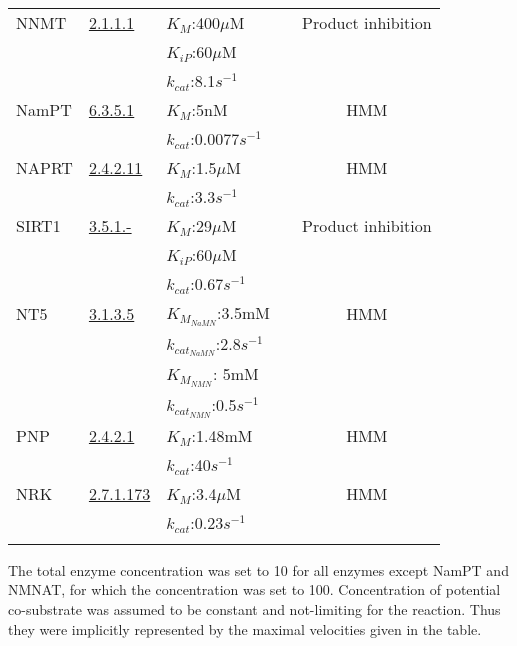 \documentclass[a4paper,10pt]{article} \usepackage[utf8x]{inputenc}
\begin{document}
\begin{longtable}{p{3cm}p{2cm}p{3cm}cc}
    \\ \hline
NNMT & \href{http://www.chem.qmul.ac.uk/iubmb/enzyme/EC2/1/1/1.html}{2.1.1.1}
&$K_M$:400$\mu$M  & \cite{Aksoy1994} & Product inhibition\\
& & $K_{iP}$:60$\mu$M  & & 
    \\
    & & $k_{cat}$:8.1$s^{-1}$  & \cite{Alston1988}& 
    \\  \hline
NamPT & \href{http://www.chem.qmul.ac.uk/iubmb/enzyme/EC6/3/5/1.html}{6.3.5.1}
&$K_M$:5nM  & \cite{Burgos2008} & HMM\\
    & & $k_{cat}$:0.0077$s^{-1}$  & & 
    \\  \hline
    NAPRT &
       \href{http://www.chem.qmul.ac.uk/iubmb/enzyme/EC2/4/2/11.html}{2.4.2.11}
    &$K_M$:1.5$\mu$M  & \cite{Burgos2008} & HMM\\
    & & $k_{cat}$:3.3$s^{-1}$  & & 
    \\  \hline
    SIRT1 &
    \href{http://www.chem.qmul.ac.uk/iubmb/enzyme/EC3/5/1/index.html}{3.5.1.-}
    &$K_M$:29$\mu$M  & \cite{Borra2004} & Product inhibition\\
    & & $K_{iP}$:60$\mu$M  & & 
    \\
    & & $k_{cat}$:0.67$s^{-1}$  & & 
    \\  \hline
    NT5 &
    \href{http://www.chem.qmul.ac.uk/iubmb/enzyme/EC3/1/3/5.html}{3.1.3.5}
    &$K_{M_{NaMN}}$:3.5mM  & \cite{PMID26385918} & HMM \\
    & & $k_{{cat}_{NaMN}}$:2.8$s^{-1}$ 
    & & \\ 
    & &$K_{M_{NMN}}$: 5mM   &  \\
     & & $k_{{cat}_{NMN}}$:0.5$s^{-1}$ 
     & & \\  \hline  
     PNP &
    \href{http://www.chem.qmul.ac.uk/iubmb/enzyme/EC3/2/4/2.html}{2.4.2.1}
    &$K_M$:1.48mM  & \cite{PMID9030766} & HMM \\
    & & $k_{cat}$:40$s^{-1}$ 
    & & \\  \hline    
    NRK &
    \href{http://www.chem.qmul.ac.uk/iubmb/enzyme/EC2/7/1/173.html}{2.7.1.173}
    &$K_M$:3.4$\mu$M & \cite{PMID19027704} & HMM \\
    & & $k_{cat}$:0.23$s^{-1}$ 
    & & \\  \hline    
  \bottomrule
  \label{tab:kinetic}
\end{longtable}

The total enzyme concentration was set to 10 for all enzymes  except NamPT and NMNAT, for which the concentration was set to 100. Concentration of potential co-substrate was assumed to be constant
and not-limiting for the reaction. Thus they were  implicitly represented by the
maximal velocities given in the table.
\end{document}
